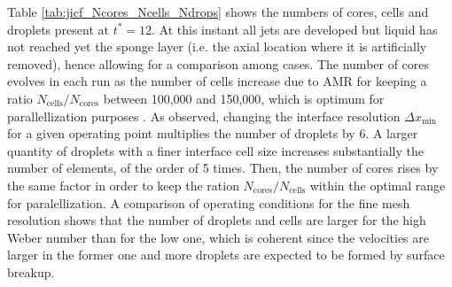 Table \ref{tab:jicf_Ncores_Ncells_Ndrops} shows the numbers of cores, cells and droplets present at $t^* = 12$. At this instant all jets are developed but liquid has not reached yet the sponge layer (i.e. the axial location where it is artificially removed), hence allowing for a comparison among cases. The number of cores evolves in each run as the number of cells increase due to AMR for keeping a ratio $N_\mathrm{cells} / N_\mathrm{cores}$ between 100,000 and 150,000, which is optimum for parallellization purposes . As observed, changing the interface resolution $\Delta x_\mathrm{min}$ for a given operating point multiplies the number of droplets by 6. A larger quantity of droplets with a finer interface cell size increases substantially the number of elements, of the order of 5 times. Then, the number of cores rises by the same factor in order to keep the ration $N_\mathrm{cores}/N_\mathrm{cells}$ within the optimal range for paralellization. A comparison of operating conditions for the fine mesh resolution shows that the number of droplets and cells are larger for the high Weber number than for the low one, which is coherent since the velocities are larger in the former one and more droplets are expected to be formed by surface breakup. %

